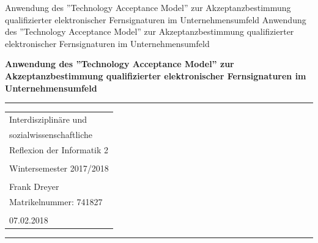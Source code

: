 \documentclass[deutsch]{lib/llncs/llncs}
\begin{document}
\markboth
{Anwendung des ''Technology Acceptance Model'' zur Akzeptanzbestimmung qualifizierter elektronischer  Fernsignaturen im Unternehmensumfeld}
{Anwendung des ''Technology Acceptance Model'' zur Akzeptanzbestimmung qualifizierter elektronischer  Fernsignaturen im Unternehmensumfeld}
\thispagestyle{empty}


\begin{flushleft}
\LARGE\bfseries Anwendung des ''Technology Acceptance Model'' zur Akzeptanzbestimmung qualifizierter elektronischer  Fernsignaturen im Unternehmensumfeld


\end{flushleft}
\rule{\textwidth}{1pt}
\vspace{2pt}


\begin{flushright}
\Huge


\begin{tabular}{@{}l}
Interdisziplinäre und \\
sozialwissenschaftliche \\
Reflexion der Informatik 2\\\\
Wintersemester 2017/2018\\\\
Frank Dreyer\\
Matrikelnummer: 741827\\\\
07.02.2018\\[6pt]
\end{tabular}


\end{flushright}
\rule{\textwidth}{1pt}
\vfill

\newpage
\tableofcontents
\newpage\vspace{2pt}
\end{document}
